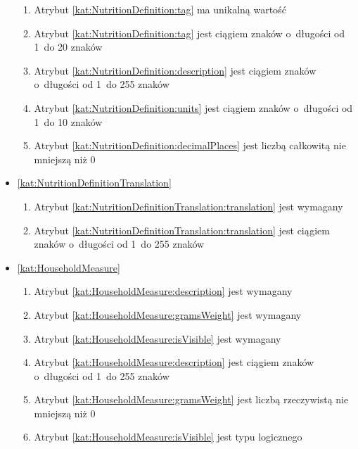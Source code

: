 \begin{itemize}[label={\textbf{Ograniczenia dla}}, wide, labelwidth=!, labelindent=0pt]
\begin{enumerate}[label={\textbf{OGR/\protect\threedigits{\arabic{enumi}}}}, wide, labelwidth=!, align=left, leftmargin=3cm, resume]
        \item Atrybut \ref{kat:NutritionDefinition:tag} ma unikalną wartość

        \item Atrybut \ref{kat:NutritionDefinition:tag} jest ciągiem znaków o~długości od 1~do 20 znaków
        \item Atrybut \ref{kat:NutritionDefinition:description} jest ciągiem znaków o~długości od 1~do 255 znaków
        \item Atrybut \ref{kat:NutritionDefinition:units} jest ciągiem znaków o~długości od 1~do 10 znaków
        \item Atrybut \ref{kat:NutritionDefinition:decimalPlaces} jest liczbą całkowitą nie mniejszą niż 0
    \end{enumerate}

    \item\ref{kat:NutritionDefinitionTranslation}
    \begin{enumerate}[label={\textbf{OGR/\protect\threedigits{\arabic{enumi}}}}, wide, labelwidth=!, align=left, leftmargin=3cm, resume]
        \item Atrybut \ref{kat:NutritionDefinitionTranslation:translation} jest wymagany

        \item Atrybut \ref{kat:NutritionDefinitionTranslation:translation} jest ciągiem znaków o~długości od 1~do 255 znaków
    \end{enumerate}

    \item\ref{kat:HouseholdMeasure}
    \begin{enumerate}[label={\textbf{OGR/\protect\threedigits{\arabic{enumi}}}}, wide, labelwidth=!, align=left, leftmargin=3cm, resume]
        \item Atrybut \ref{kat:HouseholdMeasure:description} jest wymagany
        \item Atrybut \ref{kat:HouseholdMeasure:gramsWeight} jest wymagany
        \item Atrybut \ref{kat:HouseholdMeasure:isVisible} jest wymagany

        \item Atrybut \ref{kat:HouseholdMeasure:description} jest ciągiem znaków o~długości od 1~do 255 znaków
        \item Atrybut \ref{kat:HouseholdMeasure:gramsWeight} jest liczbą rzeczywistą nie mniejszą niż 0
        \item Atrybut \ref{kat:HouseholdMeasure:isVisible} jest typu logicznego
    \end{enumerate}


\end{itemize}
